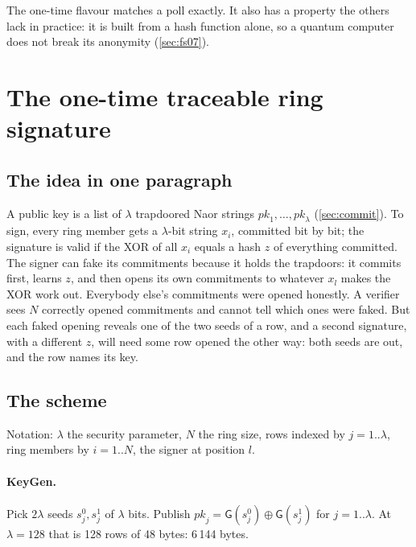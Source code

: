 \documentclass[11pt,a4paper]{article}
\newcommand{\pk}{\mathit{pk}}
\newcommand{\Gf}{\mathsf{G}}
\newcommand{\KeyGen}{\textsf{KeyGen}}
\theoremstyle{definition}
\begin{document}
\noindent
The one-time flavour matches a poll exactly. It also has a property the
others lack in practice: it is built from a hash function alone, so a
quantum computer does not break its anonymity (\cref{sec:fs07}).

\section{The one-time traceable ring signature}
\label{sec:otrs}

\subsection{The idea in one paragraph}

A public key is a list of $\lambda$ trapdoored Naor strings $\pk_1, \ldots,
\pk_\lambda$ (\cref{sec:commit}). To sign, every ring member gets a
$\lambda$-bit string $x_i$, committed bit by bit; the signature is valid if
the XOR of all $x_i$ equals a hash $z$ of everything committed. The
signer can fake its commitments because it holds the trapdoors: it
commits first, learns $z$, and then opens its own commitments to whatever
$x_l$ makes the XOR work out. Everybody else's commitments were opened
honestly. A verifier sees $N$ correctly opened commitments and cannot tell
which ones were faked. But each faked opening reveals one of the two seeds
of a row, and a second signature, with a different $z$, will need some row
opened the other way: both seeds are out, and the row names its key.

\subsection{The scheme}
\label{sec:otrs-scheme}

Notation: $\lambda$ the security parameter, $N$ the ring size, rows
indexed by $j = 1..\lambda$, ring members by $i = 1..N$, the signer at
position $l$.

\paragraph{\KeyGen.} Pick $2\lambda$ seeds $s^0_j, s^1_j$ of $\lambda$
bits. Publish $\pk_j = \Gf(s^0_j) \oplus \Gf(s^1_j)$ for $j = 1..\lambda$.
At $\lambda = 128$ that is 128 rows of 48 bytes: 6\,144 bytes.
\end{document}
